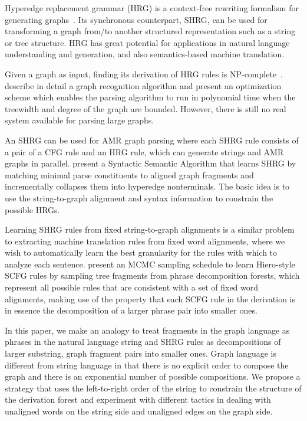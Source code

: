 Hyperedge replacement grammar (HRG) is a context-free rewriting formalism for generating graphs~\cite{drewes+al:1997}. 
Its synchronous counterpart, SHRG, can be used for transforming a graph from/to another structured representation such as a string
or tree structure. HRG has great potential for applications in natural language understanding and generation,
and also semantics-based machine translation. 


Given a graph as input, finding its derivation of HRG rules is NP-complete~\cite{drewes+al:1997}. 
 describe in detail a graph recognition algorithm
and present an optimization scheme which enables the
parsing algorithm to run in polynomial time when the treewidth and degree
of the graph are bounded. However, there is still no real system available
for parsing large graphs.


An SHRG can be used for AMR graph parsing where each SHRG rule consists of a pair of a CFG rule and an HRG rule, 
which can generate strings and AMR graphs in parallel. 
 present a Syntactic Semantic Algorithm that learns SHRG by matching minimal parse constituents
to aligned graph fragments and incrementally collapses them into hyperedge nonterminals. 
The basic idea is to use the string-to-graph alignment and syntax information to constrain the possible HRGs.


Learning SHRG rules 
from fixed string-to-graph alignments is a similar problem to extracting machine translation rules from fixed word
alignments, where we wish to automatically learn the best granularity for the rules with which to analyze each
sentence.  present an MCMC sampling schedule to learn Hiero-style SCFG rules \cite{ChiangCL} by sampling 
tree fragments from phrase decomposition forests, which represent all possible
rules that are consistent with a set of fixed word alignments, making use of the property that each SCFG rule in the 
derivation is in essence the 
decomposition of a larger phrase pair into smaller ones.


In this paper, we make an analogy to treat fragments in the graph language as phrases in the natural language string 
and SHRG rules as
decompositions of larger substring, graph fragment pairs into smaller ones. 
Graph language is different
from string language in that there is no explicit order to compose the graph and there is an exponential number of possible 
compositions. We propose a strategy that uses the left-to-right order of the string to constrain the structure of the 
derivation forest and experiment with different tactics in dealing with unaligned words on the string side and unaligned
edges on the graph side.


